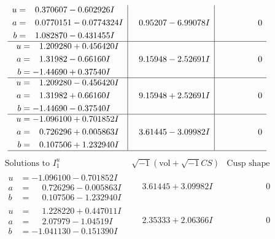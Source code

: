 \documentclass[1p]{elsarticle_modified}
\theoremstyle{definition}
\newcommand{\I}{\sqrt{-1}}
\begin{document}
$$\begin{array}{c|c|c}
\begin{aligned}
u &= \phantom{-}0.370607 - 0.602926 I \\
a &= \phantom{-}0.0770151 - 0.0774324 I \\
b &= \phantom{-}1.082870 - 0.431455 I\end{aligned}
 & \phantom{-}0.95207 - 6.99078 I & \phantom{-0.000000 } 0 \\ \hline\begin{aligned}
u &= \phantom{-}1.209280 + 0.456420 I \\
a &= \phantom{-}1.31982 - 0.66160 I \\
b &= -1.44690 + 0.37540 I\end{aligned}
 & \phantom{-}9.15948 - 2.52691 I & \phantom{-0.000000 } 0 \\ \hline\begin{aligned}
u &= \phantom{-}1.209280 - 0.456420 I \\
a &= \phantom{-}1.31982 + 0.66160 I \\
b &= -1.44690 - 0.37540 I\end{aligned}
 & \phantom{-}9.15948 + 2.52691 I & \phantom{-0.000000 } 0 \\ \hline\begin{aligned}
u &= -1.096100 + 0.701852 I \\
a &= \phantom{-}0.726296 + 0.005863 I \\
b &= \phantom{-}0.107506 + 1.232940 I\end{aligned}
 & \phantom{-}3.61445 - 3.09982 I & \phantom{-0.000000 } 0\\
 \hline 
 \end{array}$$\newpage$$\begin{array}{c|c|c}  
\text{Solutions to }I^u_{1}& \I (\text{vol} + \sqrt{-1}CS) & \text{Cusp shape}\\
 \hline 
\begin{aligned}
u &= -1.096100 - 0.701852 I \\
a &= \phantom{-}0.726296 - 0.005863 I \\
b &= \phantom{-}0.107506 - 1.232940 I\end{aligned}
 & \phantom{-}3.61445 + 3.09982 I & \phantom{-0.000000 } 0 \\ \hline\begin{aligned}
u &= \phantom{-}1.228220 + 0.447011 I \\
a &= \phantom{-}2.07979 - 1.04519 I \\
b &= -1.041130 - 0.151390 I\end{aligned}
 & \phantom{-}2.35333 + 2.06366 I & \phantom{-0.000000 } 0 \\ \hline\begin{aligned}

\end{aligned}
\end{array}$$
\end{document}
